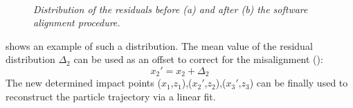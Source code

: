\begin{figure}[!htbp]
  \centering 
  \\
  \caption{ {\it Distribution of the residuals before (a) and after (b) the
      software alignment procedure.}}
  \label{fig:tan_alpha}
\end{figure}

 shows an example of such a distribution. The mean value of the
residual distribution $\Delta_2$ can be used as an offset to correct for the
misalignment ():
\begin{equation}
x_2'  =  x_2 + \Delta_2
\end{equation}
The new determined impact points ($x_1$,$z_1$),($x_2'$,$z_2$),($x_3'$,$z_3$) can be
finally used to reconstruct the particle trajectory via a linear fit.


